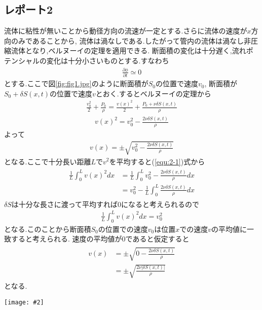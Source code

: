 \documentclass[uplatex,a4j,11pt,dvipdfmx]{jsarticle}
\makeatletter
\def\fgcaption{\def\@captype{figure}\caption}
\newcommand{\mfig}[3][width=15cm]{
\begin{center}
\texttt{[image: \#2]}
\fgcaption{#3 \label{fig:#2}}
\end{center}
}
\makeatother
\begin{document}
\subsection*{レポート2}
流体に粘性が無いことから動径方向の流速が一定とする.さらに流体の速度が$x$方向のみであることから,
流体は渦なしである.したがって管内の流体は渦なし非圧縮流体となり,ベルヌーイの定理を適用できる.
断面積の変化は十分遅く,流れポテンシャルの変化は十分小さいものとする.すなわち
\begin{align}
  \frac{\partial \phi}{\partial t}\simeq0
\end{align}
とする.ここで図\ref{fig:fig1.jpg}のように断面積が$S_0$の位置で速度$v_0$,
断面積が$S_0+\delta S(x,t)$の位置で速度$v$とおく.するとベルヌーイの定理から
\begin{align*}
  \frac{v_0^2}{2}+\frac{P_0}{\rho}=\frac{v(x)^2}{2}+\frac{P_0+\nu\delta S(x,t)}{\rho}    
\end{align*}
\begin{align}
  \label{equ:2-1}
  v(x)^2=v_0^2-\frac{2\nu\delta S(x,t)}{\rho}
\end{align}
よって
\begin{align}
  v(x)=\pm\sqrt{v_0^2-\frac{2\nu\delta S(x,t)}{\rho}}
\end{align}
となる.ここで十分長い距離$L$で$v^2$を平均すると(\ref{equ:2-1})式から
\begin{align}
  \begin{split}
    \frac{1}{L}\int_0^Lv(x)^2dx&=\frac{1}{L}\int_0^Lv_0^2-\frac{2\nu\delta S(x,t)}{\rho}dx\\
    &=v_0^2-\frac{1}{L}\int_0^L\frac{2\nu\delta S(x,t)}{\rho}dx
  \end{split}
\end{align}
$\delta S$は十分な長さに渡って平均すれば0になると考えられるので
\begin{align}
  \frac{1}{L}\int_0^Lv(x)^2dx=v_0^2
\end{align}
となる.このことから断面積$S_0$の位置での速度$v_0$は位置$x$での速度$v$の平均値に一致すると考えられる.
速度の平均値が0であると仮定すると
\begin{align}
  \begin{split}
    v(x)&=\pm\sqrt{0-\frac{2\nu\delta S(x,t)}{\rho}}\\
    &=\pm\sqrt{\frac{2\nu|\delta S(x,t)|}{\rho}}
  \end{split}
\end{align}
となる.
\mfig[width=8cm]{fig1.jpg}{断面積の変化}
\end{document}
